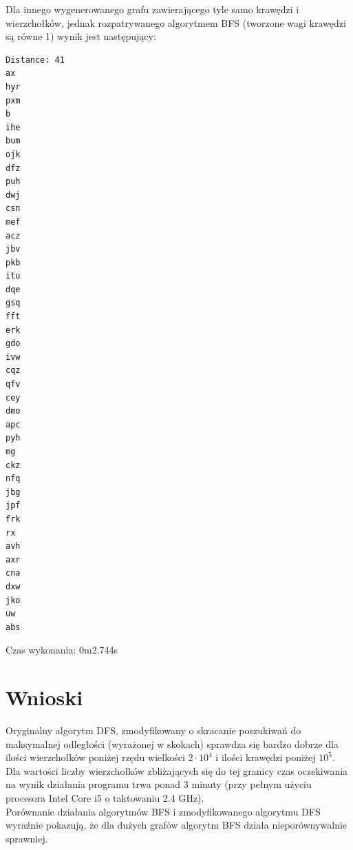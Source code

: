 \documentclass[a4paper, 12pt]{article}
\begin{document}
Dla innego wygenerowanego grafu zawierającego tyle samo krawędzi i wierzchołków, jednak rozpatrywanego algorytmem BFS (tworzone wagi krawędzi są równe 1) wynik jest następujący:
\begin{multicols}{2}
\begin{verbatim}
Distance: 41
ax
hyr
pxm
b
ihe
bum
ojk
dfz
puh
dwj
csn
mef
acz
jbv
pkb
itu
dqe
gsq
fft
erk
gdo
ivw
cqz
qfv
cey
dmo
apc
pyh
mg
ckz
nfq
jbg
jpf
frk
rx
avh
axr
cna
dxw
jko
uw
abs
\end{verbatim}
\end{multicols}
Czas wykonania: 0m2.744s
\section{Wnioski}
Oryginalny algorytm DFS, zmodyfikowany o skracanie poszukiwań do maksymalnej odległości (wyrażonej w skokach) sprawdza się bardzo dobrze dla ilości wierzchołków poniżej rzędu wielkości $2 \cdot 10^4$ i ilości krawędzi poniżej $10^5$.
Dla wartości liczby wierzchołków zbliżających się do tej granicy czas oczekiwania na wynik działania programu trwa ponad 3 minuty (przy pełnym użyciu procesora Intel Core i5 o taktowaniu 2.4 GHz).\\
Porównanie działania algorytmów BFS i zmodyfikowanego algorytmu DFS wyraźnie pokazują, że dla dużych grafów algorytm BFS działa nieporównywalnie sprawniej.
\end{document}

